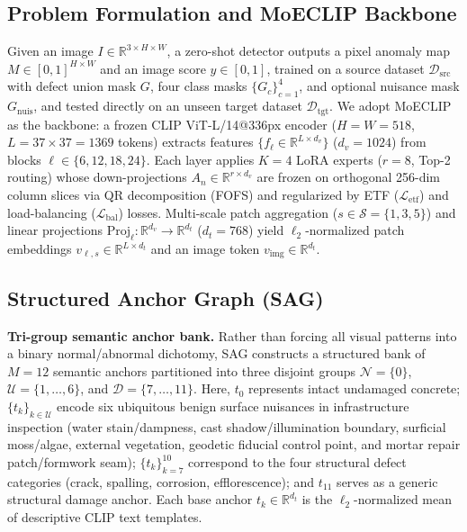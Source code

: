 \documentclass[conference]{IEEEtran}
\newcommand{\sag}{SAG}
\begin{document}
\subsection{Problem Formulation and MoECLIP Backbone}

Given an image $I \in \mathbb{R}^{3 \times H \times W}$, a zero-shot detector outputs a pixel anomaly map $M \in [0,1]^{H \times W}$ and an image score $y \in [0,1]$, trained on a source dataset $\mathcal{D}_{\mathrm{src}}$ with defect union mask $G$, four class masks $\{G_c\}_{c=1}^{4}$, and optional nuisance mask $G_{\mathrm{nuis}}$, and tested directly on an unseen target dataset $\mathcal{D}_{\mathrm{tgt}}$. We adopt MoECLIP~\cite{park2026moeclip} as the backbone: a frozen CLIP ViT-L/14@336px encoder ($H{=}W{=}518$, $L{=}37{\times}37{=}1369$ tokens) extracts features $\{f_\ell \in \mathbb{R}^{L \times d_v}\}$ ($d_v{=}1024$) from blocks $\ell \in \{6, 12, 18, 24\}$. Each layer applies $K{=}4$ LoRA experts ($r{=}8$, Top-2 routing) whose down-projections $A_n \in \mathbb{R}^{r \times d_v}$ are frozen on orthogonal 256-dim column slices via QR decomposition (FOFS) and regularized by ETF ($\mathcal{L}_{\mathrm{etf}}$) and load-balancing ($\mathcal{L}_{\mathrm{bal}}$) losses. Multi-scale patch aggregation ($s \in \mathcal{S}{=}\{1,3,5\}$) and linear projections $\mathrm{Proj}_\ell: \mathbb{R}^{d_v} \to \mathbb{R}^{d_t}$ ($d_t{=}768$) yield $\ell_2$-normalized patch embeddings $v_{\ell,s} \in \mathbb{R}^{L \times d_t}$ and an image token $v_{\mathrm{img}} \in \mathbb{R}^{d_t}$.

\subsection{Structured Anchor Graph (\sag{})}

\textbf{Tri-group semantic anchor bank.} Rather than forcing all visual patterns into a binary normal/abnormal dichotomy, \sag{} constructs a structured bank of $M{=}12$ semantic anchors partitioned into three disjoint groups $\mathcal{N}{=}\{0\}$, $\mathcal{U}{=}\{1,\dots,6\}$, and $\mathcal{D}{=}\{7,\dots,11\}$. Here, $t_0$ represents intact undamaged concrete; $\{t_k\}_{k \in \mathcal{U}}$ encode six ubiquitous benign surface nuisances in infrastructure inspection (water stain/dampness, cast shadow/illumination boundary, surficial moss/algae, external vegetation, geodetic fiducial control point, and mortar repair patch/formwork seam); $\{t_k\}_{k=7}^{10}$ correspond to the four structural defect categories (crack, spalling, corrosion, efflorescence); and $t_{11}$ serves as a generic structural damage anchor. Each base anchor $t_k \in \mathbb{R}^{d_t}$ is the $\ell_2$-normalized mean of descriptive CLIP text templates.
\end{document}
